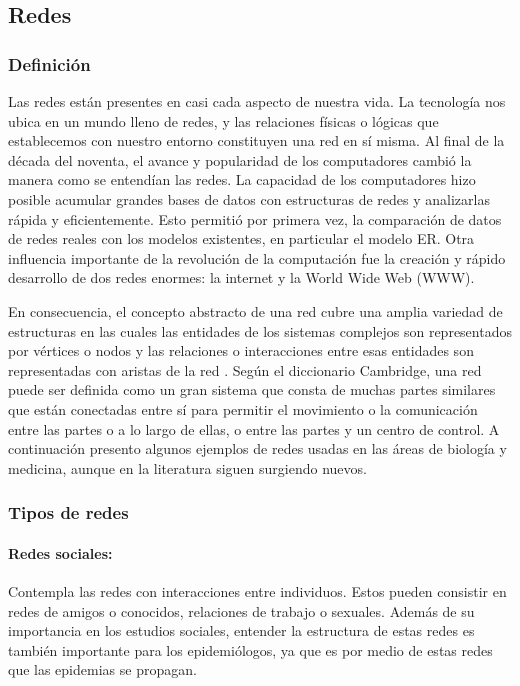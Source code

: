 \subsection{Redes}
\subsubsection{Definición}
Las redes están presentes en casi cada aspecto de nuestra vida. La tecnología nos ubica en un mundo lleno de redes, y las relaciones físicas o lógicas que establecemos con nuestro entorno constituyen una red en sí misma. Al final de la década del noventa, el avance y popularidad de los computadores cambió la manera como se entendían las redes. La capacidad de los computadores hizo posible acumular grandes bases de datos con estructuras de redes y analizarlas rápida y eficientemente. Esto permitió por primera vez, la comparación de datos de redes reales con los modelos existentes, en particular el modelo ER. Otra influencia importante de la revolución de la computación fue la creación y rápido desarrollo de dos redes enormes: la internet y la World Wide Web (WWW). 

En consecuencia, el concepto abstracto de una red cubre una amplia variedad de estructuras en las cuales las entidades de los sistemas complejos son representados por vértices o nodos y las relaciones o interacciones entre esas entidades son representadas con aristas de la red \cite{Estrada2015ATheory}. Según el diccionario Cambridge, una red puede ser definida como un gran sistema que consta de muchas partes similares que están conectadas entre sí para permitir el movimiento o la comunicación entre las partes o a lo largo de ellas, o entre las partes y un centro de control. A continuación presento algunos ejemplos de redes usadas en las áreas de biología y medicina, aunque en la literatura siguen surgiendo nuevos.

\subsubsection{Tipos de redes}
% 
% 
 
\paragraph{Redes sociales:} Contempla las redes con interacciones entre individuos. Estos pueden consistir en redes de amigos o conocidos, relaciones de trabajo o sexuales. Además de su importancia en los estudios sociales, entender la estructura de estas redes es también importante para los epidemiólogos, ya que es por medio de estas redes que las epidemias se propagan. \cite{Cohen2010}
 
